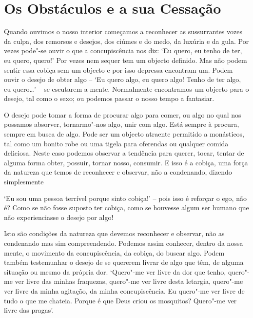 \chapter{Os Obstáculos e a sua Cessação}

Quando ouvimos o nosso interior começamos a reconhecer as sussurrantes
vozes da culpa, dos remorsos e desejos, dos ciúmes e do medo, da luxúria
e da gula. Por vezes pode"-se ouvir o que a concupiscência nos diz: `Eu
quero, eu tenho de ter, eu quero, quero!' Por vezes nem sequer tem um
objecto definido. Mas não podem sentir essa cobiça sem um objecto e por
isso depressa encontram um. Podem ouvir o desejo de obter algo -- `Eu
quero algo, eu quero algo! Tenho de ter algo, eu quero\ldots{}' -- se
escutarem a mente. Normalmente encontramos um objecto para o desejo, tal
como o sexo; ou podemos passar o nosso tempo a fantasiar.

O desejo pode tomar a forma de procurar algo para comer, ou algo no qual
nos possamos absorver, tornarmo"-nos algo, unir com algo. Está sempre à
procura, sempre em busca de algo. Pode ser um objecto atraente permitido
a monásticos, tal como um bonito robe ou uma tigela para oferendas ou
qualquer comida deliciosa. Neste caso podemos observar a tendência para
querer, tocar, tentar de alguma forma obter, possuir, tornar nosso,
consumir. E isso é a cobiça, uma força da natureza que temos de
reconhecer e observar, não a condenando, dizendo simplesmente

`Eu sou uma pessoa terrível porque sinto cobiça!' -- pois isso é
reforçar o ego, não é? Como se não fosse suposto ter cobiça, como se
houvesse algum ser humano que não experienciasse o desejo por algo!

Isto são condições da natureza que devemos reconhecer e
observar, não as condenando mas sim compreendendo. Podemos
assim conhecer, dentro da nossa mente, o movimento da concupiscência, da
cobiça, do buscar algo. Podem também testemunhar o desejo de se quererem
livrar de algo que têm, de alguma situação ou mesmo da própria dor.
`Quero"-me ver livre da dor que tenho, quero"-me ver livre das minhas
fraquezas, quero"-me ver livre desta letargia, quero"-me ver livre da
minha agitação, da minha concupiscência. Eu quero"-me ver livre de tudo o
que me chateia. Porque é que Deus criou os mosquitos? Quero"-me ver livre
das pragas'.

